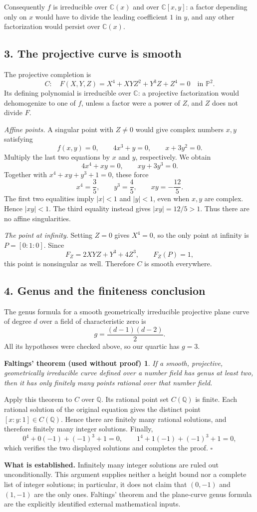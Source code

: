\documentclass[11pt,a4paper]{article}
\newtheorem*{faltings}{Faltings' theorem (used without proof)}
\newcommand{\C}{\mathbb C}
\newcommand{\Q}{\mathbb Q}
\begin{document}
Consequently $f$ is irreducible over $\C(x)$ and over $\C[x,y]$: a factor
depending only on $x$ would have to divide the leading coefficient $1$ in
$y$, and any other factorization would persist over $\C(x)$.

\newpage
\subsection*{3. The projective curve is smooth}
The projective completion is
\[
  C:\quad F(X,Y,Z)=X^4+XYZ^2+Y^3Z+Z^4=0
  \quad\text{in }\mathbb P^2.
\]
Its defining polynomial is irreducible over $\C$: a projective
factorization would dehomogenize to one of $f$, unless a factor were a power
of $Z$, and $Z$ does not divide $F$.

\textit{Affine points.} A singular point with $Z\ne0$ would give complex
numbers $x,y$ satisfying
\[
  f(x,y)=0,\qquad 4x^3+y=0,\qquad x+3y^2=0.
\]
Multiply the last two equations by $x$ and $y$, respectively. We obtain
\[
  4x^4+xy=0,\qquad xy+3y^3=0.
\]
Together with $x^4+xy+y^3+1=0$, these force
\[
  \boxed{\quad x^4=\frac35,\qquad y^3=\frac45,
  \qquad xy=-\frac{12}{5}.\quad}
\]
The first two equalities imply $|x|<1$ and $|y|<1$, even when $x,y$ are
complex. Hence $|xy|<1$. The third equality instead gives
$|xy|=12/5>1$. Thus there are no affine singularities.

\textit{The point at infinity.} Setting $Z=0$ gives $X^4=0$, so the only
point at infinity is $P=[0:1:0]$. Since
\[
  F_Z=2XYZ+Y^3+4Z^3,\qquad F_Z(P)=1,
\]
this point is nonsingular as well. Therefore $C$ is smooth everywhere.

\subsection*{4. Genus and the finiteness conclusion}
The genus formula for a smooth geometrically irreducible projective plane
curve of degree $d$ over a field of characteristic zero is
\[
  g=\frac{(d-1)(d-2)}2.
\]
All its hypotheses were checked above, so our quartic has $g=3$.

\begin{faltings}
If a smooth, projective, geometrically irreducible curve defined over a
number field has genus at least two, then it has only finitely many points
rational over that number field.
\end{faltings}

Apply this theorem to $C$ over $\Q$. Its rational point set $C(\Q)$ is
finite. Each rational solution of the original equation gives the distinct
point $[x:y:1]\in C(\Q)$. Hence there are finitely many rational solutions,
and therefore finitely many integer solutions. Finally,
\[
  0^4+0(-1)+(-1)^3+1=0,
  \qquad 1^4+1(-1)+(-1)^3+1=0,
\]
which verifies the two displayed solutions and completes the proof.
\hfill$\square$

\textbf{What is established.} Infinitely many integer solutions are ruled
out unconditionally. This argument supplies neither a height bound nor a
complete list of integer solutions; in particular, it does not claim that
$(0,-1)$ and $(1,-1)$ are the only ones. Faltings' theorem and the plane-curve
genus formula are the explicitly identified external mathematical inputs.
\end{document}
